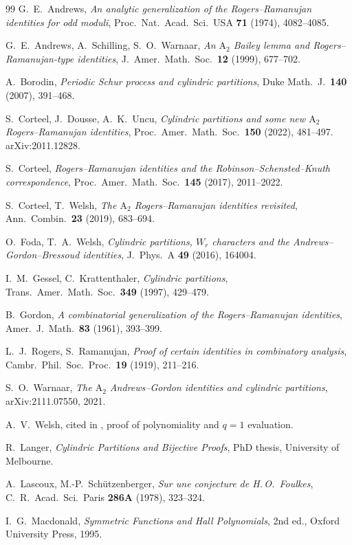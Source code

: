\documentclass[11pt]{article}
\theoremstyle{plain}
\theoremstyle{definition}
\begin{document}
\begin{thebibliography}{99}
  G.~E.~Andrews,
  \emph{An analytic generalization of the Rogers--Ramanujan identities for odd moduli},
  Proc.\ Nat.\ Acad.\ Sci.\ USA \textbf{71} (1974), 4082--4085.

  G.~E.~Andrews, A.~Schilling, S.~O.~Warnaar,
  \emph{An $\mathrm{A}_2$ Bailey lemma and Rogers--Ramanujan-type identities},
  J.~Amer.\ Math.\ Soc.\ \textbf{12} (1999), 677--702.

  A.~Borodin,
  \emph{Periodic Schur process and cylindric partitions},
  Duke Math.~J.\ \textbf{140} (2007), 391--468.

  S.~Corteel, J.~Dousse, A.~K.~Uncu,
  \emph{Cylindric partitions and some new $\mathrm{A}_2$ Rogers--Ramanujan identities},
  Proc.\ Amer.\ Math.\ Soc.\ \textbf{150} (2022), 481--497.
  arXiv:2011.12828.

  S.~Corteel,
  \emph{Rogers--Ramanujan identities and the Robinson--Schensted--Knuth correspondence},
  Proc.\ Amer.\ Math.\ Soc.\ \textbf{145} (2017), 2011--2022.

  S.~Corteel, T.~Welsh,
  \emph{The $\mathrm{A}_2$ Rogers--Ramanujan identities revisited},
  Ann.\ Combin.\ \textbf{23} (2019), 683--694.

  O.~Foda, T.~A.~Welsh,
  \emph{Cylindric partitions, $W_r$ characters and the Andrews--Gordon--Bressoud identities},
  J.\ Phys.\ A \textbf{49} (2016), 164004.

  I.~M.~Gessel, C.~Krattenthaler,
  \emph{Cylindric partitions},
  Trans.\ Amer.\ Math.\ Soc.\ \textbf{349} (1997), 429--479.

  B.~Gordon,
  \emph{A combinatorial generalization of the Rogers--Ramanujan identities},
  Amer.\ J.\ Math.\ \textbf{83} (1961), 393--399.

  L.~J.~Rogers, S.~Ramanujan,
  \emph{Proof of certain identities in combinatory analysis},
  Cambr.\ Phil.\ Soc.\ Proc.\ \textbf{19} (1919), 211--216.

  S.~O.~Warnaar,
  \emph{The $\mathrm{A}_2$ Andrews--Gordon identities and cylindric partitions},
  arXiv:2111.07550, 2021.

  A.~V.~Welsh,
  cited in \cite{W}, proof of polynomiality and $q=1$ evaluation.

  R.~Langer,
  \emph{Cylindric Partitions and Bijective Proofs},
  PhD thesis, University of Melbourne.

  A.~Lascoux, M.-P.~Sch\"utzenberger,
  \emph{Sur une conjecture de H.\,O.~Foulkes},
  C.~R.\ Acad.\ Sci.\ Paris \textbf{286A} (1978), 323--324.

  I.~G.~Macdonald,
  \emph{Symmetric Functions and Hall Polynomials},
  2nd ed., Oxford University Press, 1995.
\end{thebibliography}
\end{document}
